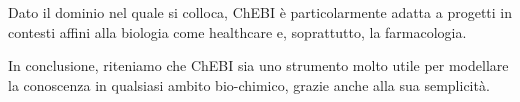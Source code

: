 \documentclass[12pt,a4paper,openright,twoside]{book}
\begin{document}
Dato il dominio nel quale si colloca, ChEBI è particolarmente adatta a progetti in contesti affini alla biologia come healthcare e, soprattutto, la farmacologia.

In conclusione, riteniamo che ChEBI sia uno strumento molto utile per modellare la conoscenza in qualsiasi ambito bio-chimico, grazie anche alla sua semplicità.
\end{document}
